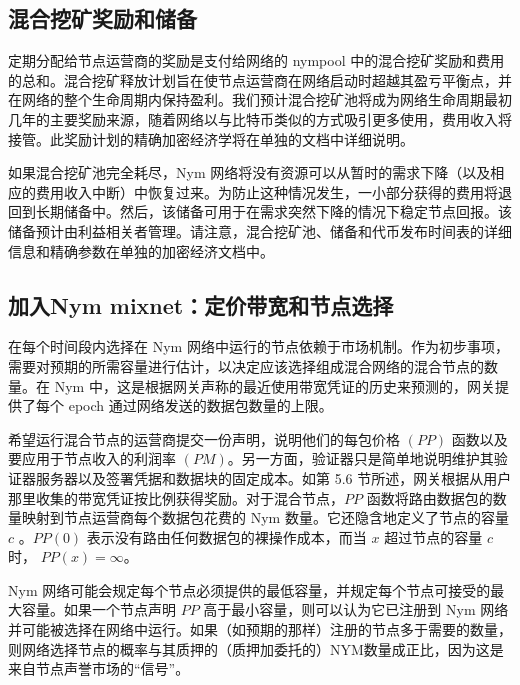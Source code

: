 \documentclass{article}
\begin{document}
	\subsection{混合挖矿奖励和储备}

	定期分配给节点运营商的奖励是支付给网络的 nympool 中的混合挖矿奖励和费用的总和。混合挖矿释放计划旨在使节点运营商在网络启动时超越其盈亏平衡点，并在网络的整个生命周期内保持盈利。我们预计混合挖矿池将成为网络生命周期最初几年的主要奖励来源，随着网络以与比特币类似的方式吸引更多使用，费用收入将接管。此奖励计划的精确加密经济学将在单独的文档中详细说明。\newline

	如果混合挖矿池完全耗尽，Nym 网络将没有资源可以从暂时的需求下降（以及相应的费用收入中断）中恢复过来。为防止这种情况发生，一小部分获得的费用将退回到长期储备中。然后，该储备可用于在需求突然下降的情况下稳定节点回报。该储备预计由利益相关者管理。请注意，混合挖矿池、储备和代币发布时间表的详细信息和精确参数在单独的加密经济文档中。\newline

	\subsection{加入Nym mixnet：定价带宽和节点选择}

	在每个时间段内选择在 Nym 网络中运行的节点依赖于市场机制。作为初步事项，需要对预期的所需容量进行估计，以决定应该选择组成混合网络的混合节点的数量。在 Nym 中，这是根据网关声称的最近使用带宽凭证的历史来预测的，网关提供了每个 epoch 通过网络发送的数据包数量的上限。\newline

	希望运行混合节点的运营商提交一份声明，说明他们的每包价格 $(PP)$ 函数以及要应用于节点收入的利润率 $(PM)$。另一方面，验证器只是简单地说明维护其验证器服务器以及签署凭据和数据块的固定成本。如第 5.6 节所述，网关根据从用户那里收集的带宽凭证按比例获得奖励。对于混合节点，$PP$ 函数将路由数据包的数量映射到节点运营商每个数据包花费的 Nym 数量。它还隐含地定义了节点的容量 $c$ 。$PP(0)$ 表示没有路由任何数据包的裸操作成本，而当 $x$ 超过节点的容量 $c$ 时， $PP(x) = ∞$。\newline

	Nym 网络可能会规定每个节点必须提供的最低容量，并规定每个节点可接受的最大容量。如果一个节点声明 $PP$ 高于最小容量，则可以认为它已注册到 Nym 网络并可能被选择在网络中运行。如果（如预期的那样）注册的节点多于需要的数量，则网络选择节点的概率与其质押的（质押加委托的）NYM数量成正比，因为这是来自节点声誉市场的“信号”。\newline
\end{document}
